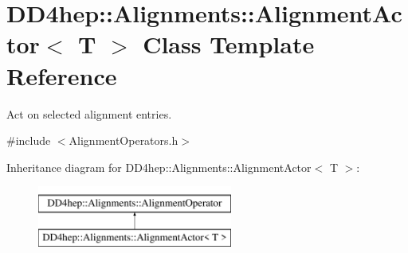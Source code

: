 \hypertarget{class_d_d4hep_1_1_alignments_1_1_alignment_actor}{}\section{D\+D4hep\+:\+:Alignments\+:\+:Alignment\+Actor$<$ T $>$ Class Template Reference}
\label{class_d_d4hep_1_1_alignments_1_1_alignment_actor}


Act on selected alignment entries.  




{\ttfamily \#include $<$Alignment\+Operators.\+h$>$}

Inheritance diagram for D\+D4hep\+:\+:Alignments\+:\+:Alignment\+Actor$<$ T $>$\+:\begin{figure}[H]
\begin{center}
\leavevmode
\includegraphics[height=2.000000cm]{class_d_d4hep_1_1_alignments_1_1_alignment_actor}
\end{center}
\end{figure}
